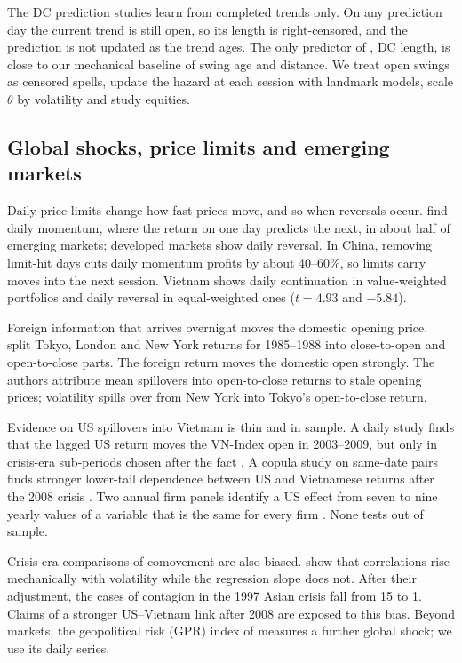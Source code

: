 The DC prediction studies learn from completed trends only. On any prediction day the current trend is still open,
so its length is right-censored, and the prediction is not updated as the trend ages. The only
predictor of \citet{AdegboyeKampouridis2021}, DC length, is close to our mechanical baseline of swing age and distance. We treat open
swings as censored spells, update the hazard at each session with landmark models, scale $\theta$ by
volatility and study equities.

\subsection{Global shocks, price limits and emerging markets}

Daily price limits change how fast prices move, and so when reversals occur.
\citet{GaoJiangXiongXiong2023} find daily momentum, where the return on one day predicts the next,
in about half of emerging markets; developed markets show daily reversal. In China, removing
limit-hit days cuts daily momentum profits by about 40--60\%, so limits carry moves into the next
session. Vietnam shows daily continuation in value-weighted portfolios and daily reversal in
equal-weighted ones ($t = 4.93$ and $-5.84$).

Foreign information that arrives overnight moves the domestic opening price.
\citet{HamaoMasulisNg1990} split Tokyo, London and New York returns for 1985--1988 into
close-to-open and open-to-close parts. The foreign return moves the domestic open strongly. The
authors attribute mean spillovers into open-to-close returns to stale opening prices; volatility
spills over from New York into Tokyo's open-to-close return.

Evidence on US spillovers into Vietnam is thin and in sample. A daily study finds that the lagged
US return moves the VN-Index open in 2003--2009, but only in crisis-era sub-periods chosen after the
fact \citep{Luu2011}. A copula
study on same-date pairs finds stronger lower-tail dependence between US and Vietnamese returns after
the 2008 crisis \citep{NguyenBhattiHenry2017}.
Two annual firm panels identify a US effect from seven to nine yearly values of a variable that is
the same for every firm \citep{VoNguyen2016,NguyenHoLe2025}. None
tests out of sample.

Crisis-era comparisons of comovement are also biased. \citet{ForbesRigobon2002} show that
correlations rise mechanically with volatility while the regression slope does not. After their
adjustment, the cases of contagion in the 1997 Asian crisis fall from 15 to 1. Claims of a stronger
US--Vietnam link after 2008 are exposed to this bias. Beyond markets, the geopolitical risk (GPR)
index of \citet{CaldaraIacoviello2022} measures a further global shock; we use its daily series.

